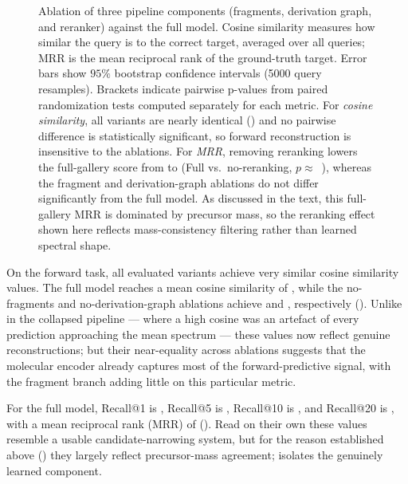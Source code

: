 \begin{figure}[H]
    \centering
    \caption[Cosine similarity and MRR for ablation variants]{
        Ablation of three pipeline components (fragments, derivation graph, and reranker) against the full model.
        Cosine similarity measures how similar the query is to the correct target, averaged over all queries; MRR is the mean reciprocal rank of the ground-truth target. 
        Error bars show $95\%$ bootstrap confidence intervals (5000 query resamples). 
        Brackets indicate pairwise p-values from paired randomization tests 
        computed separately for each metric. 
        For \emph{cosine similarity}, all variants are nearly identical () and no pairwise difference is statistically significant, so forward reconstruction is insensitive to the ablations.
        For \emph{MRR}, removing reranking lowers the full-gallery score from  to  (Full vs.\ no-reranking, $p \approx$~),
        whereas the fragment and derivation-graph ablations do not differ significantly from the full model.
        As discussed in the text, this full-gallery MRR is dominated by precursor mass, so the reranking effect shown here reflects mass-consistency filtering rather than learned spectral shape.
        }
    \label{fig:cosine-mrr}
\end{figure}

On the forward task, all evaluated variants achieve very similar cosine similarity values.
The full model reaches a mean cosine similarity of , while the no-fragments and no-derivation-graph ablations achieve  and , respectively ().
Unlike in the collapsed pipeline --- where a high cosine was an artefact of every prediction approaching the mean spectrum --- these values now reflect genuine reconstructions; but their near-equality across ablations suggests that the molecular encoder already captures most of the forward-predictive signal, with the fragment branch adding little on this particular metric.

For the full model, Recall@1 is , Recall@5 is , Recall@10 is , and Recall@20 is , with a mean reciprocal rank (MRR) of  ().
Read on their own these values resemble a usable candidate-narrowing system, but for the reason established above () they largely reflect precursor-mass agreement;  isolates the genuinely learned component.

